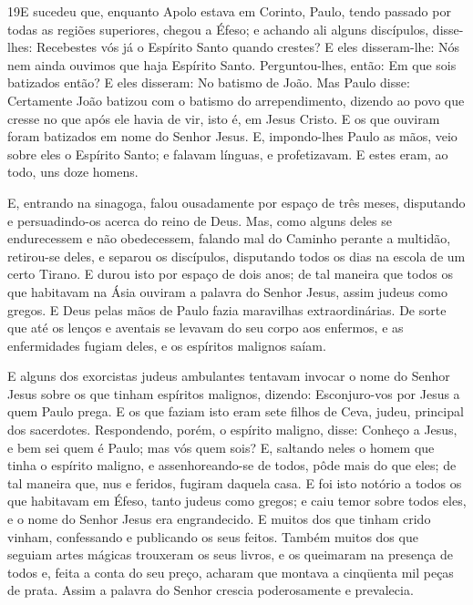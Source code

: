 \medskip

\lettrine{19} E sucedeu que, enquanto Apolo estava em Corinto,
Paulo, tendo passado por todas as regiões superiores, chegou a
Éfeso; e achando ali alguns discípulos, disse-lhes: Recebestes
vós já o Espírito Santo quando crestes? E eles disseram-lhe: Nós nem
ainda ouvimos que haja Espírito Santo. Perguntou-lhes, então: Em
que sois batizados então? E eles disseram: No batismo de João.
Mas Paulo disse: Certamente João batizou com o batismo do
arrependimento, dizendo ao povo que cresse no que após ele havia de
vir, isto é, em Jesus Cristo. E os que ouviram foram batizados
em nome do Senhor Jesus. E, impondo-lhes Paulo as mãos, veio
sobre eles o Espírito Santo; e falavam línguas, e profetizavam.
E estes eram, ao todo, uns doze homens.

E, entrando na sinagoga, falou ousadamente por espaço de três
meses, disputando e per\-su\-a\-din\-do-os acerca do reino de Deus. Mas,
como alguns deles se endurecessem e não obedecessem, falando mal do
Caminho perante a multidão, retirou-se deles, e separou os
discípulos, disputando todos os dias na escola de um certo Tirano.
E durou isto por espaço de dois anos; de tal maneira que
todos os que habitavam na Ásia ouviram a palavra do Senhor Jesus,
assim judeus como gregos. E Deus pelas mãos de Paulo fazia
maravilhas extraordinárias. De sorte que até os lenços e
aventais se levavam do seu corpo aos enfermos, e as enfermidades
fugiam deles, e os espíritos malignos saíam.

E alguns dos exorcistas judeus ambulantes tentavam invocar o nome
do Senhor Jesus sobre os que tinham espíritos malignos, dizendo:
Esconjuro-vos por Jesus a quem Paulo prega. E os que faziam
isto eram sete filhos de Ceva, judeu, principal dos sacerdotes.
Respondendo, porém, o espírito maligno, disse: Conheço a
Jesus, e bem sei quem é Paulo; mas vós quem sois? E, saltando
neles o homem que tinha o espírito maligno, e assenhoreando-se de
todos, pôde mais do que eles; de tal maneira que, nus e feridos,
fugiram daquela casa. E foi isto notório a todos os que
habitavam em Éfeso, tanto judeus como gregos; e caiu temor sobre
todos eles, e o nome do Senhor Jesus era engrandecido. E
muitos dos que tinham crido vinham, confessando e publicando os seus
feitos. Também muitos dos que seguiam artes mágicas trouxeram
os seus livros, e os queimaram na presença de todos e, feita a conta
do seu preço, acharam que montava a cinqüenta mil peças de prata.
Assim a palavra do Senhor crescia poderosamente e prevalecia.

